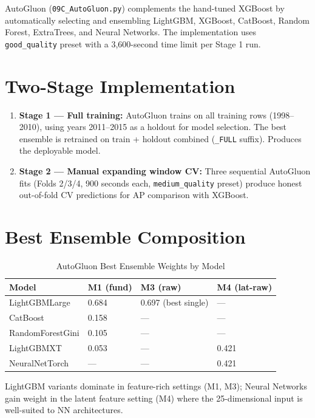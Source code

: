 \documentclass{report}\usepackage[]{graphicx}\usepackage[table]{xcolor}
\begin{document}
AutoGluon (\texttt{09C\_AutoGluon.py}) complements the hand-tuned XGBoost by 
automatically selecting and ensembling LightGBM, XGBoost, CatBoost, 
Random Forest, ExtraTrees, and Neural Networks. The implementation uses 
\texttt{good\_quality} preset with a 3,600-second time limit per Stage 1 run.

\section{Two-Stage Implementation}

\begin{enumerate}
    \item \textbf{Stage 1 — Full training:} AutoGluon trains on all training rows 
    (1998--2010), using years 2011--2015 as a holdout for model selection. 
    The best ensemble is retrained on train + holdout combined (\texttt{\_FULL} suffix). 
    Produces the deployable model.
    
    \item \textbf{Stage 2 — Manual expanding window CV:} Three sequential AutoGluon fits 
    (Folds 2/3/4, 900 seconds each, \texttt{medium\_quality} preset) produce honest 
    out-of-fold CV predictions for AP comparison with XGBoost.
\end{enumerate}

\section{Best Ensemble Composition}

\begin{table}[H]
\centering
\caption{AutoGluon Best Ensemble Weights by Model}
\begin{tabular}{llll}
\toprule
\textbf{Model} & \textbf{M1 (fund)} & \textbf{M3 (raw)} & \textbf{M4 (lat-raw)} \\
\midrule
LightGBMLarge & 0.684 & 0.697 (best single) & — \\
CatBoost & 0.158 & — & — \\
RandomForestGini & 0.105 & — & — \\
LightGBMXT & 0.053 & — & 0.421 \\
NeuralNetTorch & — & — & 0.421 \\
\bottomrule
\end{tabular}
\end{table}

\noindent LightGBM variants dominate in feature-rich settings (M1, M3); 
Neural Networks gain weight in the latent feature setting (M4) where the 
25-dimensional input is well-suited to NN architectures.
\end{document}
